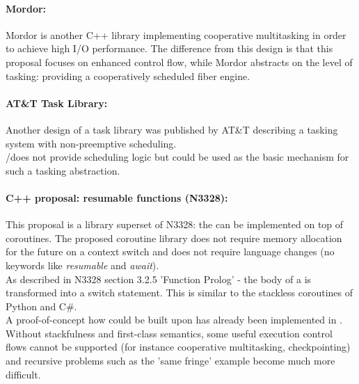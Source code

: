 \paragraph*{Mordor:}
Mordor\cite{mordor} is another C++ library implementing cooperative multitasking
in order to achieve high I/O performance. The difference from this design is that
this proposal focuses on enhanced control flow, while Mordor\cite{mordor} abstracts
on the level of tasking: providing a cooperatively scheduled fiber engine.

\paragraph*{AT\&T Task Library:}
Another design of a task library was published by AT\&T\cite{atnt1989}
describing a tasking system with non-preemptive scheduling.\\
\pushcoro/\pullcoro does not provide scheduling logic but could be used as the
basic mechanism for such a tasking abstraction.

\paragraph*{C++ proposal: resumable functions (N3328\cite{n3328}):}
This proposal is a library superset of N3328: the \resumfn can be implemented
on top of coroutines. The proposed coroutine library does not require memory allocation
for the future on a context switch and does not require language changes (no keywords
like \textit{resumable} and \textit{await}).\\
As described in N3328 section 3.2.5 'Function Prolog' - the body of a \resumfn is
transformed into a switch statement. This is similar to the stackless coroutines
of Python and C\#.\\
A proof-of-concept how \await could be built upon \boostcoroutine has already been
implemented in \awaitemu.\\
\newline
Without stackfulness and first-class semantics, some useful execution control
flows cannot be supported (for instance cooperative multitasking,
checkpointing) and recursive problems such as the 'same fringe' example become
much more difficult.

